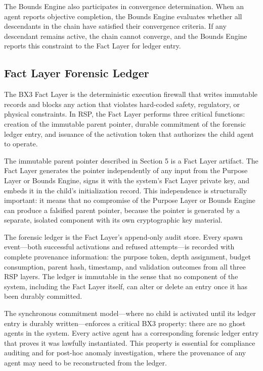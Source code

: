The Bounds Engine also participates in convergence determination. When an agent reports objective completion, the Bounds Engine evaluates whether all descendants in the chain have satisfied their convergence criteria. If any descendant remains active, the chain cannot converge, and the Bounds Engine reports this constraint to the Fact Layer for ledger entry.

\subsection{Fact Layer Forensic Ledger}

The BX3 Fact Layer is the deterministic execution firewall that writes immutable records and blocks any action that violates hard-coded safety, regulatory, or physical constraints. In RSP, the Fact Layer performs three critical functions: creation of the immutable parent pointer, durable commitment of the forensic ledger entry, and issuance of the activation token that authorizes the child agent to operate.

The immutable parent pointer described in Section 5 is a Fact Layer artifact. The Fact Layer generates the pointer independently of any input from the Purpose Layer or Bounds Engine, signs it with the system's Fact Layer private key, and embeds it in the child's initialization record. This independence is structurally important: it means that no compromise of the Purpose Layer or Bounds Engine can produce a falsified parent pointer, because the pointer is generated by a separate, isolated component with its own cryptographic key material.

The forensic ledger is the Fact Layer's append-only audit store. Every spawn event—both successful activations and refused attempts—is recorded with complete provenance information: the purpose token, depth assignment, budget consumption, parent hash, timestamp, and validation outcomes from all three RSP layers. The ledger is immutable in the sense that no component of the system, including the Fact Layer itself, can alter or delete an entry once it has been durably committed.

The synchronous commitment model—where no child is activated until its ledger entry is durably written—enforces a critical BX3 property: there are no ghost agents in the system. Every active agent has a corresponding forensic ledger entry that proves it was lawfully instantiated. This property is essential for compliance auditing and for post-hoc anomaly investigation, where the provenance of any agent may need to be reconstructed from the ledger.

